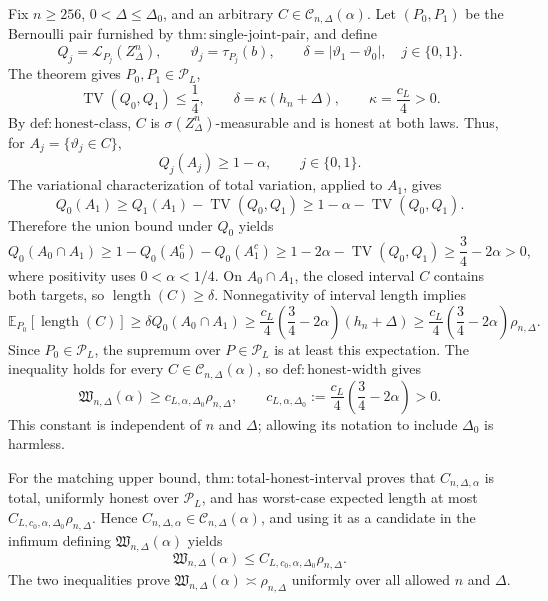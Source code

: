 Fix \(n\geq256\), \(0<\Delta\leq\Delta_0\), and an arbitrary \(C\in\mathcal C_{n,\Delta}(\alpha)\).  Let \((P_0,P_1)\) be the Bernoulli pair furnished by \(\mathrm{thm:single\text{-}joint\text{-}pair}\), and define
\[
 Q_j=\mathcal L_{P_j}(Z_\Delta^n),
 \qquad
 \vartheta_j=\tau_{P_j}(b),
 \qquad
 \delta=|\vartheta_1-\vartheta_0|,
 \quad j\in\{0,1\}.
\]
The theorem gives \(P_0,P_1\in\mathcal P_L\),
\[
 \operatorname{TV}(Q_0,Q_1)\leq\frac14,
 \qquad
 \delta=\kappa(h_n+\Delta),
 \qquad
 \kappa=\frac{c_L}{4}>0.
\]
By \(\mathrm{def:honest\text{-}class}\), \(C\) is \(\sigma(Z_\Delta^n)\)-measurable and is honest at both laws.  Thus, for \(A_j=\{\vartheta_j\in C\}\),
\[
 Q_j(A_j)\geq1-\alpha,
 \qquad j\in\{0,1\}.
\]
The variational characterization of total variation, applied to \(A_1\), gives
\[
 Q_0(A_1)\geq Q_1(A_1)-\operatorname{TV}(Q_0,Q_1)
 \geq1-\alpha-\operatorname{TV}(Q_0,Q_1).
\]
Therefore the union bound under \(Q_0\) yields
\[
 Q_0(A_0\cap A_1)
 \geq1-Q_0(A_0^c)-Q_0(A_1^c)
 \geq1-2\alpha-\operatorname{TV}(Q_0,Q_1)
 \geq\frac34-2\alpha>0,
\]
where positivity uses \(0<\alpha<1/4\).  On \(A_0\cap A_1\), the closed interval \(C\) contains both targets, so \(\operatorname{length}(C)\geq\delta\).  Nonnegativity of interval length implies
\[
 \mathbb E_{P_0}[\operatorname{length}(C)]
 \geq\delta Q_0(A_0\cap A_1)
 \geq\frac{c_L}{4}\left(\frac34-2\alpha\right)(h_n+\Delta)
 \geq\frac{c_L}{4}\left(\frac34-2\alpha\right)\rho_{n,\Delta}.
\]
Since \(P_0\in\mathcal P_L\), the supremum over \(P\in\mathcal P_L\) is at least this expectation.  The inequality holds for every \(C\in\mathcal C_{n,\Delta}(\alpha)\), so \(\mathrm{def:honest\text{-}width}\) gives
\[
 \mathfrak W_{n,\Delta}(\alpha)
 \geq c_{L,\alpha,\Delta_0}\rho_{n,\Delta},
 \qquad
 c_{L,\alpha,\Delta_0}:=\frac{c_L}{4}\left(\frac34-2\alpha\right)>0.
\]
This constant is independent of \(n\) and \(\Delta\); allowing its notation to include \(\Delta_0\) is harmless.

For the matching upper bound, \(\mathrm{thm:total\text{-}honest\text{-}interval}\) proves that \(C_{n,\Delta,\alpha}\) is total, uniformly honest over \(\mathcal P_L\), and has worst-case expected length at most \(C_{L,c_0,\alpha,\Delta_0}\rho_{n,\Delta}\).  Hence \(C_{n,\Delta,\alpha}\in\mathcal C_{n,\Delta}(\alpha)\), and using it as a candidate in the infimum defining \(\mathfrak W_{n,\Delta}(\alpha)\) yields
\[
 \mathfrak W_{n,\Delta}(\alpha)
 \leq C_{L,c_0,\alpha,\Delta_0}\rho_{n,\Delta}.
\]
The two inequalities prove \(\mathfrak W_{n,\Delta}(\alpha)\asymp\rho_{n,\Delta}\) uniformly over all allowed \(n\) and \(\Delta\).
